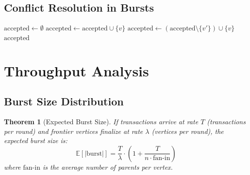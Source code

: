 \documentclass[11pt,a4paper]{article}
\newtheorem{theorem}{Theorem}[section]
\begin{document}
\subsection{Conflict Resolution in Bursts}

\begin{algorithm}[H]
\caption{Nova Conflict Resolution During Burst}
\label{alg:nova-conflict}
\begin{algorithmic}[1]
    \State $\text{accepted} \gets \emptyset$
     
            \State $\text{accepted} \gets \text{accepted} \cup \{v\}$
        \Else
            \State {}
                    \State $\text{accepted} \gets (\text{accepted} \setminus \{v'\}) \cup \{v\}$
                \EndIf
            \EndFor
        \EndIf
    \EndFor
    \Return $\text{accepted}$
\EndFunction
\end{algorithmic}
\end{algorithm}

\section{Throughput Analysis}
\label{sec:throughput}

\subsection{Burst Size Distribution}

\begin{theorem}[Expected Burst Size]
\label{thm:burst-size}
If transactions arrive at rate $T$ (transactions per round) and frontier vertices
finalize at rate $\lambda$ (vertices per round), the expected burst size is:
\[
\mathbb{E}[|\text{burst}|] = \frac{T}{\lambda} \cdot \left(1 + \frac{T}{n \cdot \text{fan-in}}\right)
\]
where $\text{fan-in}$ is the average number of parents per vertex.
\end{theorem}
\end{document}
